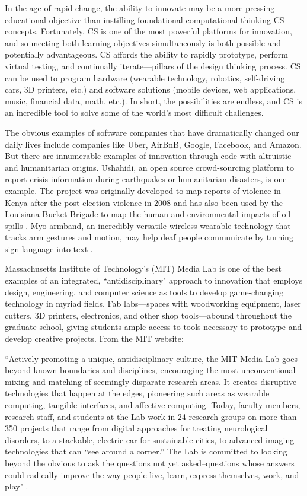 In the age of rapid change, the ability to innovate may be a more pressing educational objective than instilling foundational computational thinking CS concepts. Fortunately, CS is one of the most powerful platforms for innovation, and so meeting both learning objectives simultaneously is both possible and potentially advantageous. CS affords the ability to rapidly prototype, perform virtual testing, and continually iterate---pillars of the design thinking process. CS can be used to program hardware (wearable technology, robotics, self-driving cars, 3D printers, etc.) and software solutions (mobile devices, web applications, music, financial data, math, etc.). In short, the possibilities are endless, and CS is an incredible tool to solve some of the world's most difficult challenges.\par
The obvious examples of software companies that have dramatically changed our daily lives include companies like Uber, AirBnB, Google, Facebook, and Amazon. But there are innumerable examples of innovation through code with altruistic and humanitarian origins. Ushahidi, an open source crowd-sourcing platform to report crisis information during earthquakes or humanitarian disasters, is one example. The project was originally developed to map reports of violence in Kenya after the post-election violence in 2008 \cite{ushahidi} and has also been used by the Louisiana Bucket Brigade to map the human and environmental impacts of oil spills \cite{labb}. Myo armband, an incredibly versatile wireless wearable technology that tracks arm gestures and motion, may help deaf people communicate by turning sign language into text \cite{myowhat}. \par 
Massachusetts Institute of Technology's (MIT) Media Lab is one of the best examples of an integrated, ``antidisciplinary" approach to innovation that employs design, engineering, and computer science as tools to develop game-changing technology in myriad fields. Fab labs---spaces with woodworking equipment, laser cutters, 3D printers, electronics, and other shop tools---abound throughout the graduate school, giving students ample access to tools necessary to prototype and develop creative projects. From the MIT website:
\begin{blockquote}
	``Actively promoting a unique, antidisciplinary culture, the MIT Media Lab goes beyond known boundaries and disciplines, encouraging the most unconventional mixing and matching of seemingly disparate research areas. It creates disruptive technologies that happen at the edges, pioneering such areas as wearable computing, tangible interfaces, and affective computing. Today, faculty members, research staff, and students at the Lab work in 24 research groups on more than 350 projects that range from digital approaches for treating neurological disorders, to a stackable, electric car for sustainable cities, to advanced imaging technologies that can “see around a corner.” The Lab is committed to looking beyond the obvious to ask the questions not yet asked–questions whose answers could radically improve the way people live, learn, express themselves, work, and play" \cite{mitmediaabout}.
	\end{blockquote}
